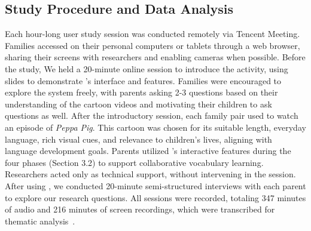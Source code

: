 \subsection{Study Procedure and Data Analysis}
Each hour-long user study session was conducted remotely via Tencent Meeting. Families accessed \name{} on their personal computers or tablets through a web browser, sharing their screens with researchers and enabling cameras when possible. Before the study, We held a 20-minute online session to introduce the activity, using slides to demonstrate \name{}'s interface and features. Families were encouraged to explore the system freely, with parents asking 2-3 questions based on their understanding of the cartoon videos and motivating their children to ask questions as well. After the introductory session, each family pair used \name{} to watch an episode of \textit{Peppa Pig}. This cartoon was chosen for its suitable length, everyday language, rich visual cues, and relevance to children's lives, aligning with language development goals. Parents utilized \name{}'s interactive features during the four phases (Section 3.2) to support collaborative vocabulary learning. Researchers acted only as technical support, without intervening in the session. After using \name{}, we conducted 20-minute semi-structured interviews with each parent to explore our research questions. All sessions were recorded, totaling 347 minutes of audio and 216 minutes of screen recordings, which were transcribed for thematic analysis~\cite{braun2006using}.





